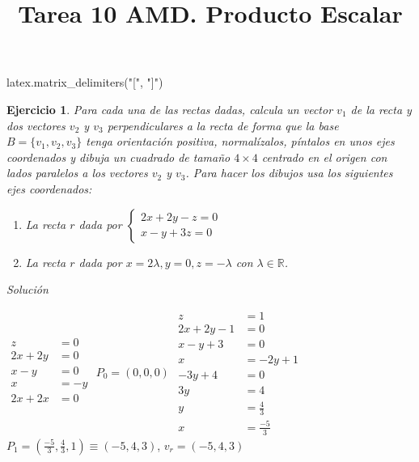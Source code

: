 \documentclass{amsart}
\title{Tarea 10 AMD. Producto Escalar}
\newtheorem{ejer}{Ejercicio}
\begin{document}
\maketitle

\begin{sagecode}
latex.matrix_delimiters("[", "]")
\end{sagecode}

\begin{ejer}
Para cada una de las rectas dadas, calcula un vector $v_1$ de la recta y dos vectores 
$v_2$ y $v_3$ perpendiculares a la recta de forma que la base $B = \{v_1,v_2,v_3\}$ tenga 
orientación positiva, normalízalos, píntalos en unos ejes coordenados y dibuja un cuadrado de 
tamaño $4\times 4$ centrado en el origen con lados paralelos a los vectores $v_2$ y $v_3$.
Para hacer los dibujos usa los siguientes ejes coordenados:

\begin{sagesub}
\begin{center}
\end{center}
\end{sagesub}


\begin{enumerate}
\item La recta $r$ dada por $\begin{cases} 2x+2y-z = 0 \\ x-y+3z = 0 \end{cases} $
\item La recta $r$ dada por $x = 2\lambda, y = 0, z = -\lambda$ con $\lambda \in {\mathbb R}$.
\end{enumerate}
\end{ejer}

{\it Solución}


$
\begin{aligned}
	z &= 0 \\
	2x + 2y &= 0 \\
	x - y &= 0 \\
	x &= -y \\
	2x + 2x &= 0 \\
\end{aligned}$
$P_0 = (0, 0, 0)$
$\begin{aligned}
	z &= 1 \\
	2x + 2y - 1 &= 0 \\
	x - y + 3 &= 0 \\
	x &= -2y + 1 \\
	-3y + 4 &= 0 \\
	3y &= 4 \\
	y &= \frac{4}{3} \\
	x &= \frac{-5}{3}
\end{aligned}$
$P_1 = (\frac{-5}{3}, \frac{4}{3}, 1) \equiv (-5, 4, 3)$, $v_r = (-5, 4, 3)$
\end{document}
